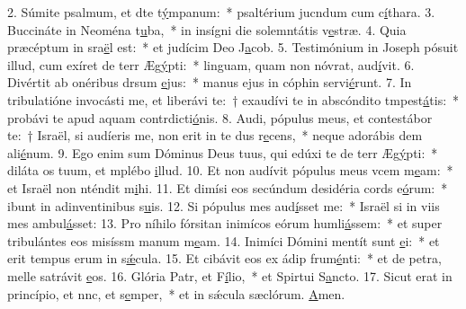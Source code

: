 2. Súmite psalmum, et dte t\uline{ý}mpanum:~* psaltérium jucndum cum c\uline{í}thara.
3. Buccináte in Neoména t\uline{u}ba,~* in insígni die solemntátis v\uline{e}stræ.
4. Quia præcéptum in sra\uline{ë}l est:~* et judícim Deo J\uline{a}cob.
5. Testimónium in Joseph pósuit illud, cum exíret de terr Æg\uline{ý}pti:~* linguam, quam non nóvrat, aud\uline{í}vit.
6. Divértit ab onéribus drsum \uline{e}jus:~* manus ejus in cóphin servi\uline{é}runt.
7. In tribulatióne invocásti me, et liberávi te:~† exaudívi te in abscóndito tmpest\uline{á}tis:~* probávi te apud aquam contrdicti\uline{ó}nis.
8. Audi, pópulus meus, et contestábor te:~† Israël, si audíeris me, non erit in te dus r\uline{e}cens,~* neque adorábis dem ali\uline{é}num.
9. Ego enim sum Dóminus Deus tuus, qui edúxi te de terr Æg\uline{ý}pti:~* diláta os tuum, et mplébo \uline{i}llud.
10. Et non audívit pópulus meus vcem m\uline{e}am:~* et Israël non nténdit m\uline{i}hi.
11. Et dimísi eos secúndum desidéria cords e\uline{ó}rum:~* ibunt in adinventinibus s\uline{u}is.
12. Si pópulus mes aud\uline{í}sset me:~* Israël si in viis mes ambul\uline{á}sset:
13. Pro níhilo fórsitan inimícos eórum humli\uline{á}ssem:~* et super tribulántes eos misíssm manum m\uline{e}am.
14. Inimíci Dómini mentít sunt \uline{e}i:~* et erit tempus erum in s\uline{ǽ}cula.
15. Et cibávit eos ex ádip frum\uline{é}nti:~* et de petra, melle satrávit \uline{e}os.
16. Glória Patr, et F\uline{í}lio,~* et Spirtui S\uline{a}ncto.
17. Sicut erat in princípio, et nnc, et s\uline{e}mper,~* et in sǽcula sæclórum. \uline{A}men.
